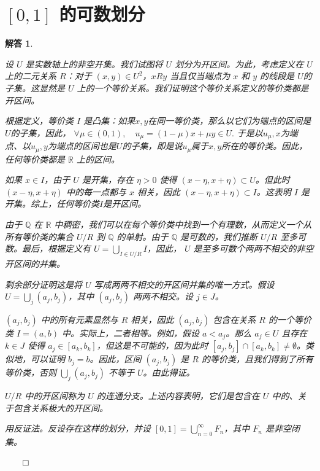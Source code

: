 \documentclass[12pt,UTF8,fontset=none]{ctexbook}
\theoremstyle{exercisestyle}
\theoremstyle{solutionstyle}
\newtheorem*{solution*}{解答}
\newenvironment{solution}
  {\begin{solution*}}
  {\hfill\ensuremath{\qed}\end{solution*}}
\begin{document}
\section{$[0,1]$ 的可数划分}
\begin{solution}
  \begin{subquestions}
    \item 设 \( U \) 是实数轴上的非空开集。我们试图将 \( U \) 划分为开区间。为此，考虑定义在 \( U \) 上的二元关系 \( R \)：对于 \((x, y) \in U^2\)，\( x R y \) 当且仅当端点为 \( x \) 和 \( y \) 的线段是 \( U \)的子集。这显然是 \( U \) 上的一个等价关系。我们证明这个等价关系定义的等价类都是开区间。
    
    根据定义，等价类 \( I \) 是凸集：如果$x, y$在同一等价类，那么以它们为端点的区间是$U$的子集，因此，
    $\forall \mu\in(0,1), \quad u_{\mu}  = (1 - \mu)x + \mu y \in U. $
    于是以$u_{\mu},x$为端点、以$u_{\mu},y$为端点的区间也是$U$的子集，即是说$u_{\mu}$属于$x,y$所在的等价类。因此，任何等价类都是 \( \mathbb{R} \) 上的区间。
    
    如果 \( x \in I \)，由于 \( U \) 是开集，存在 \( \eta > 0 \) 使得 \((x - \eta, x + \eta) \subset U\)。但此时 \((x - \eta, x + \eta)\) 中的每一点都与 \( x \) 相关，因此 \((x - \eta, x + \eta) \subset I\)。这表明 \( I \) 是开集。综上，任何等价类$I$是开区间。
    
    由于 \( \mathbb{Q} \) 在 \( \mathbb{R} \) 中稠密，我们可以在每个等价类中找到一个有理数，从而定义一个从所有等价类的集合 \( U/R \) 到 \( \mathbb{Q} \) 的单射。由于 \( \mathbb{Q} \) 是可数的，我们推断 \( U/R \) 至多可数。最后，根据定义有 \( U = \bigcup_{I \in U/R} I \)，因此， \( U \) 是至多可数个两两不相交的非空开区间的并集。

    剩余部分证明这是将 \( U \) 写成两两不相交的开区间并集的唯一方式。假设 \( U = \bigcup_j (a_j, b_j) \)，其中 \((a_j, b_j)\) 两两不相交。设 \( j \in J \)。

    \((a_j, b_j)\) 中的所有元素显然与 \( R \) 相关，因此 \((a_j, b_j)\) 包含在关系 \( R \) 的一个等价类 \( I = (a, b) \) 中。实际上，二者相等。例如，假设 \( a < a_j \)。那么 \( a_j \in U \) 且存在 \( k \in J \) 使得 \( a_j \in [a_k, b_k] \)，但这是不可能的，因为此时 \([a_j, b_j] \cap [a_k, b_k] \neq \emptyset\)。类似地，可以证明 \( b_j = b \)。因此，区间 \((a_j, b_j)\) 是 \( R \) 的等价类，且我们得到了所有等价类，否则 \(\bigcup_j (a_j, b_j)\) 不等于 \( U \)。由此得证。

    \( U/R \) 中的开区间称为 \( U \) 的连通分支。上述内容表明，它们是包含在 \( U \) 中的、关于包含关系极大的开区间。
    \item 用反证法。反设存在这样的划分，并设 \([0,1] = \bigcup_{n=0}^{\infty} F_n\)，其中 \( F_n \) 是非空闭集。


\end{subquestions}
\end{solution}
\end{document}
